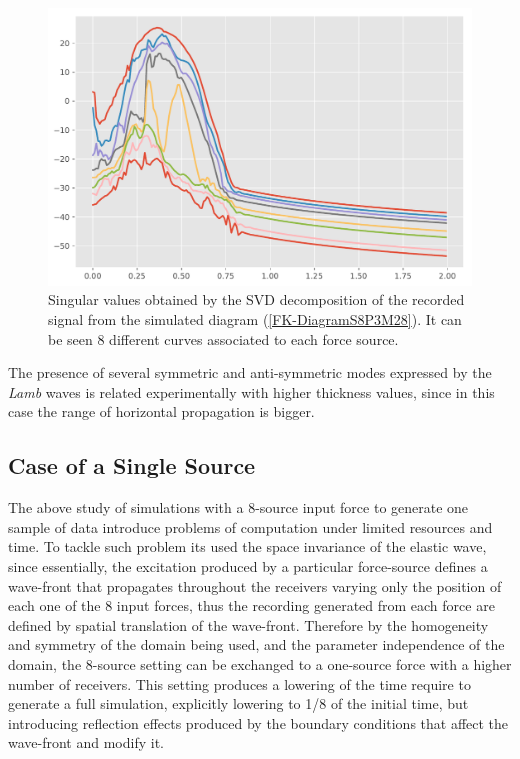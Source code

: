 \begin{figure}[!h]
	\centering
	\includegraphics[scale=.5]{images/TimeMultSous/2DTimeS8P3Elastic28_SV.pdf}
	\caption{Singular values obtained by the SVD decomposition of the recorded signal from the simulated diagram (\ref{FK-DiagramS8P3M28}). It can be seen 8 different curves associated to each force source.}
	\label{SVD-S8P3M28}
\end{figure}

\begin{rem}
The presence of several symmetric and anti-symmetric modes expressed by the \textit{Lamb} waves is related experimentally with higher thickness values, since in this case the range of horizontal propagation is bigger.
\end{rem}


\subsection{Case of a Single Source}
The above study of simulations with a 8-source input force to generate one sample of data introduce problems of computation under limited resources and time. 
To tackle such problem its used the space invariance of the elastic wave, since essentially, the excitation produced by a particular force-source defines a wave-front that propagates throughout the receivers varying only the position of each one of the 8 input forces, thus the recording generated from each force are defined by spatial translation of the wave-front. Therefore by the homogeneity and symmetry of the domain being used, and the parameter independence of the domain, the 8-source setting can be exchanged to a one-source force with a higher number of receivers. This setting produces a lowering of the time require to generate a full simulation, explicitly lowering to 1/8 of the initial time, but introducing reflection effects produced by the boundary conditions that affect the wave-front and modify it.

